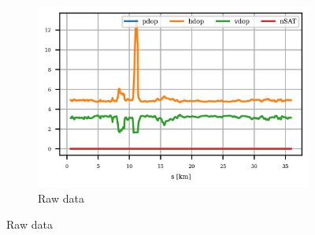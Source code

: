 \documentclass{article}
\begin{document}
			\begin{figure}[h]
		   		\centering
		     	\begin{subfigure}[b]{0.45\textwidth}
		      		\centering
		      	   \includegraphics[width=\textwidth]{Dynamic/cond_dop_IPhone 11 Pro.png}
		      	   \caption{Raw data}
		      	   \label{fig:iPhone_raw_dop}
		     	\end{subfigure}
		      \label{fig:iPhone_dop}
			\end{figure}
			
\end{document}
